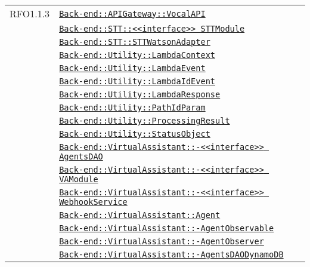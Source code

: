 \begin{longtable}{|>{\centering}m{3cm}|m{10cm}<{\centering}|}
RFO1.1.3 & \hyperref[Back-end::APIGateway::VocalAPI]{\texttt{Back-end::APIGateway::VocalAPI}}\\
& \hyperref[Back-end::STT::<<interface>> STTModule]{\texttt{Back-end::STT::<<interface>> STTModule}}\\
& \hyperref[Back-end::STT::STTWatsonAdapter]{\texttt{Back-end::STT::STTWatsonAdapter}}\\
& \hyperref[Back-end::Utility::LambdaContext]{\texttt{Back-end::Utility::LambdaContext}}\\
& \hyperref[Back-end::Utility::LambdaEvent]{\texttt{Back-end::Utility::LambdaEvent}}\\
& \hyperref[Back-end::Utility::LambdaIdEvent]{\texttt{Back-end::Utility::LambdaIdEvent}}\\
& \hyperref[Back-end::Utility::LambdaResponse]{\texttt{Back-end::Utility::LambdaResponse}}\\
& \hyperref[Back-end::Utility::PathIdParam]{\texttt{Back-end::Utility::PathIdParam}}\\
& \hyperref[Back-end::Utility::ProcessingResult]{\texttt{Back-end::Utility::ProcessingResult}}\\
& \hyperref[Back-end::Utility::StatusObject]{\texttt{Back-end::Utility::StatusObject}}\\
& \hyperref[Back-end::VirtualAssistant::<<interface>> AgentsDAO]{\texttt{Back-end::VirtualAssistant::-\linebreak <<interface>> AgentsDAO}}\\
& \hyperref[Back-end::VirtualAssistant::<<interface>> VAModule]{\texttt{Back-end::VirtualAssistant::-\linebreak <<interface>> VAModule}}\\
& \hyperref[Back-end::VirtualAssistant::<<interface>> WebhookService]{\texttt{Back-end::VirtualAssistant::-\linebreak <<interface>> WebhookService}}\\
& \hyperref[Back-end::VirtualAssistant::Agent]{\texttt{Back-end::VirtualAssistant::Agent}}\\
& \hyperref[Back-end::VirtualAssistant::AgentObservable]{\texttt{Back-end::VirtualAssistant::-\linebreak AgentObservable}}\\
& \hyperref[Back-end::VirtualAssistant::AgentObserver]{\texttt{Back-end::VirtualAssistant::-\linebreak AgentObserver}}\\
& \hyperref[Back-end::VirtualAssistant::AgentsDAODynamoDB]{\texttt{Back-end::VirtualAssistant::-\linebreak AgentsDAODynamoDB}}\\

\end{longtable}
